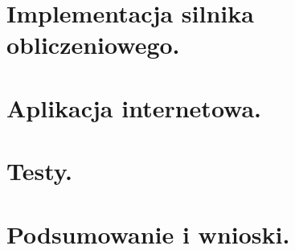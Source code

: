 \documentclass[a4paper,12pt]{article}		%
\begin{document}
\section{Implementacja silnika obliczeniowego.}

\section{Aplikacja internetowa.}

\section{Testy.}

\section{Podsumowanie i wnioski.}
\end{document}
